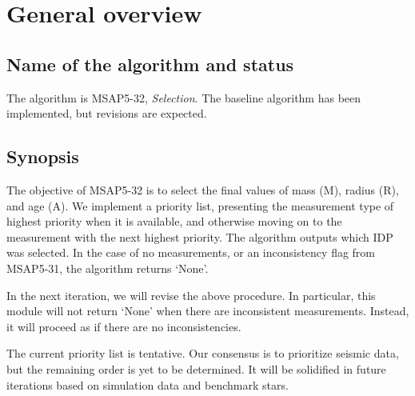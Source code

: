 \documentclass[a4paper, oneside, 11pt, article, english]{memoir}
\begin{document}
\clearpage
\chapter{General overview}
\label{chap:overview}

\section{Name of the algorithm and status}
\label{sec:name}
The algorithm is MSAP5-32, \emph{Selection}. 
The baseline algorithm has been implemented, but revisions are expected. 




\section{Synopsis}
\label{sec:synopsis}

The objective of MSAP5-32 is to select the final values of mass (M), radius (R), and age (A). We implement a priority list, presenting the measurement type of highest priority when it is available, and otherwise moving on to the measurement with the next highest priority. The algorithm outputs which IDP was selected. In the case of no measurements, or an inconsistency flag from MSAP5-31, the algorithm returns `None'. 

In the next iteration, we will revise the above procedure. In particular, this module will not return `None' when there are inconsistent measurements. Instead, it will proceed as if there are no inconsistencies. 

The current priority list is tentative. 
Our consensus is to prioritize seismic data, but the remaining order is yet to be determined. 
It will be solidified in future iterations based on simulation data and benchmark stars. 




\end{document}
